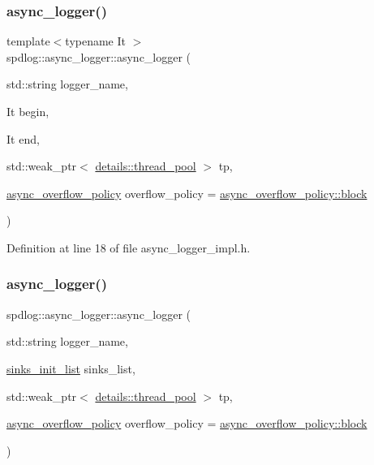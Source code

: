 \subsubsection{\texorpdfstring{async\+\_\+logger()}{async\_logger()}\hspace{0.1cm}{\footnotesize\ttfamily [1/3]}}
{\footnotesize\ttfamily template$<$typename It $>$ \\
spdlog\+::async\+\_\+logger\+::async\+\_\+logger (\begin{DoxyParamCaption}\item[{std\+::string}]{logger\+\_\+name,  }\item[{It}]{begin,  }\item[{It}]{end,  }\item[{std\+::weak\+\_\+ptr$<$ \hyperlink{classspdlog_1_1details_1_1thread__pool}{details\+::thread\+\_\+pool} $>$}]{tp,  }\item[{\hyperlink{namespacespdlog_a42e109759a11c9514d3f6313a7709852}{async\+\_\+overflow\+\_\+policy}}]{overflow\+\_\+policy = {\ttfamily \hyperlink{namespacespdlog_a42e109759a11c9514d3f6313a7709852a14511f2f5564650d129ca7cabc333278}{async\+\_\+overflow\+\_\+policy\+::block}} }\end{DoxyParamCaption})\hspace{0.3cm}{\ttfamily [inline]}}



Definition at line 18 of file async\+\_\+logger\+\_\+impl.\+h.

\mbox{\label{classspdlog_1_1async__logger_ad42c05a733917cc7e7b3d9d2ad10a47f}} 
\subsubsection{\texorpdfstring{async\+\_\+logger()}{async\_logger()}\hspace{0.1cm}{\footnotesize\ttfamily [2/3]}}
{\footnotesize\ttfamily spdlog\+::async\+\_\+logger\+::async\+\_\+logger (\begin{DoxyParamCaption}\item[{std\+::string}]{logger\+\_\+name,  }\item[{\hyperlink{namespacespdlog_aa9b5c2298bf713fbe02b7e538d797ecd}{sinks\+\_\+init\+\_\+list}}]{sinks\+\_\+list,  }\item[{std\+::weak\+\_\+ptr$<$ \hyperlink{classspdlog_1_1details_1_1thread__pool}{details\+::thread\+\_\+pool} $>$}]{tp,  }\item[{\hyperlink{namespacespdlog_a42e109759a11c9514d3f6313a7709852}{async\+\_\+overflow\+\_\+policy}}]{overflow\+\_\+policy = {\ttfamily \hyperlink{namespacespdlog_a42e109759a11c9514d3f6313a7709852a14511f2f5564650d129ca7cabc333278}{async\+\_\+overflow\+\_\+policy\+::block}} }\end{DoxyParamCaption})\hspace{0.3cm}{\ttfamily [inline]}}



